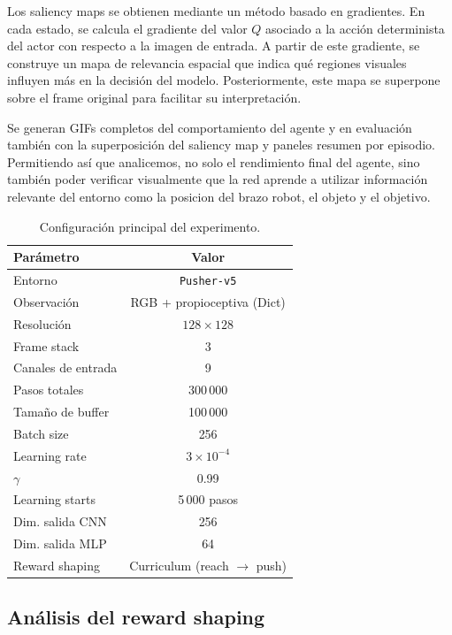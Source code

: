 \documentclass[10pt,twocolumn]{article}
\begin{document}
Los saliency maps se obtienen mediante un método basado en gradientes. En cada estado, se calcula el gradiente del valor \(Q\) asociado a la acción determinista del actor con respecto a la imagen de entrada. A partir de este gradiente, se construye un mapa de relevancia espacial que indica qué regiones visuales influyen más en la decisión del modelo. Posteriormente, este mapa se superpone sobre el frame original para facilitar su interpretación.

Se generan GIFs completos del comportamiento del agente y en evaluación también con la superposición del saliency map y paneles resumen por episodio. Permitiendo así que analicemos, no solo el rendimiento final del agente, sino también poder verificar visualmente que la red aprende a utilizar información relevante del entorno como la posicion del brazo robot, el objeto y el objetivo. 

\begin{table}[H]
\centering
\caption{Configuración principal del experimento.}
\label{tab:hyperparams_main}
\begin{tabular}{lc}
\toprule
Parámetro & Valor \\
\midrule
Entorno & \texttt{Pusher-v5} \\
Observación & RGB + propioceptiva (Dict) \\
Resolución & \(128\times128\) \\
Frame stack & 3 \\
Canales de entrada & 9 \\
Pasos totales & 300\,000 \\
Tamaño de buffer & 100\,000 \\
Batch size & 256 \\
Learning rate & \(3\times10^{-4}\) \\
\(\gamma\) & 0.99 \\
Learning starts & 5\,000 pasos \\
Dim. salida CNN & 256 \\
Dim. salida MLP & 64 \\
Reward shaping & Curriculum (reach $\rightarrow$ push) \\
\bottomrule
\end{tabular}
\end{table}

\subsection{Análisis del reward shaping}
\end{document}
